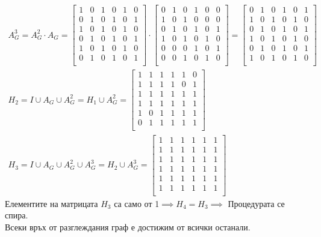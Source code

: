\documentclass[fleqn, 12pt]{article}
\theoremstyle{definition}
\begin{document}
\begin{gather*}
A_G^3 = A_G^2 \cdot A_G = 
\begin{bmatrix}
1 & 0 & 1 & 0 & 1 & 0 \\
0 & 1 & 0 & 1 & 0 & 1 \\
1 & 0 & 1 & 0 & 1 & 0 \\
0 & 1 & 0 & 1 & 0 & 1 \\
1 & 0 & 1 & 0 & 1 & 0 \\
0 & 1 & 0 & 1 & 0 & 1  \\
\end{bmatrix} 
\cdot 
\begin{bmatrix}
0 & 1 & 0 & 1 & 0 & 0 \\
1 & 0 & 1 & 0 & 0 & 0 \\
0 & 1 & 0 & 1 & 0 & 1 \\
1 & 0 & 1 & 0 & 1 & 0 \\
0 & 0 & 0 & 1 & 0 & 1 \\
0 & 0 & 1 & 0 & 1 & 0  \\
\end{bmatrix}
= 
\begin{bmatrix}
0 & 1 & 0 & 1 & 0 & 1 \\
1 & 0 & 1 & 0 & 1 & 0 \\
0 & 1 & 0 & 1 & 0 & 1 \\
1 & 0 & 1 & 0 & 1 & 0 \\
0 & 1 & 0 & 1 & 0 & 1 \\
1 & 0 & 1 & 0 & 1 & 0  \\
\end{bmatrix}\\
H_2 = I \cup A_G \cup A_G^2 = H_1 \cup A_G^2 = 
\begin{bmatrix}
1 & 1 & 1 & 1 & 1 & 0 \\
1 & 1 & 1 & 1 & 0 & 1 \\
1 & 1 & 1 & 1 & 1 & 1 \\
1 & 1 & 1 & 1 & 1 & 1 \\
1 & 0 & 1 & 1 & 1 & 1 \\
0 & 1 & 1 & 1 & 1 & 1  \\
\end{bmatrix}\\
H_3 = I \cup A_G \cup A_G^2 \cup A_G^3 = H_2 \cup A_G^3 = 
\begin{bmatrix}
1 & 1 & 1 & 1 & 1 & 1 \\
1 & 1 & 1 & 1 & 1 & 1 \\
1 & 1 & 1 & 1 & 1 & 1 \\
1 & 1 & 1 & 1 & 1 & 1 \\
1 & 1 & 1 & 1 & 1 & 1 \\
1 & 1 & 1 & 1 & 1 & 1  \\
\end{bmatrix}
\end{gather*}
Елементите  на  матрицата $H_3$ са  само  от  1$\implies H_4 = H_3 \implies$ Процедурата  се  спира. \\
Всеки връх от разглеждания граф е достижим от всички останали.
\end{document}

